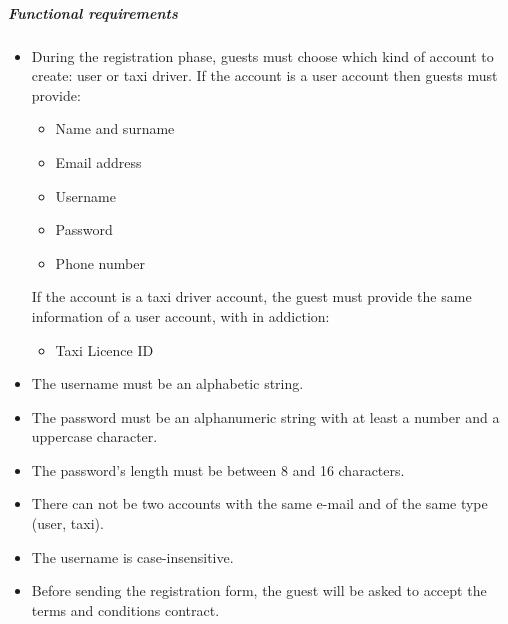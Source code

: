 \subparagraph{Functional requirements}
\noindent
	\begin{itemize}
		\item  During the registration phase, guests must choose which kind of account to create: user or taxi driver.
		If the account is a user account then guests must provide:
		\begin{itemize}
			\item Name and surname
			\item Email address
			\item Username
			\item Password
			\item Phone number
		\end{itemize}
		If the account is a taxi driver account, the guest must provide the same information of a user account, with in addiction:
		\begin{itemize}
			\item Taxi Licence ID
		\end{itemize}
		\item The username must be an alphabetic string.
		\item The password must be an alphanumeric string with at least a number and a uppercase character.
		\item The password's length must be between 8 and 16 characters.
		\item There can not be two accounts with the same e-mail and of the same type (user, taxi).
		\item The username is case-insensitive.
		\item Before sending the registration form, the guest will be asked to accept the terms and conditions contract.
	\end{itemize}
	
